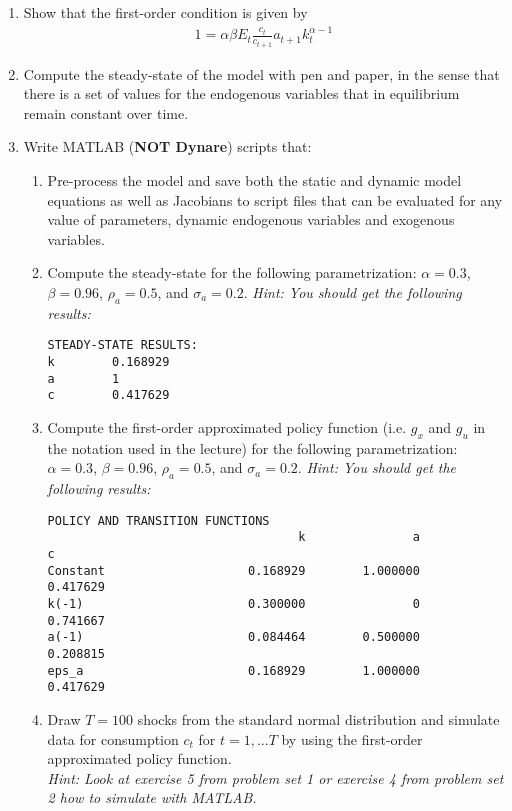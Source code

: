 \documentclass{article}
\begin{document}
\begin{enumerate}
	\item Show that the first-order condition is given by
	\begin{align}
	1 = \alpha \beta E_t \frac{c_{t}}{c_{t+1}} a_{t+1} k_{t}^{\alpha-1} \label{eq:BrockMirmanEuler}
	\end{align}
	\item Compute the steady-state of the model with pen and paper, in the sense that there is a set of values for the endogenous variables that in equilibrium remain constant over time.
    \item Write MATLAB (\textbf{NOT Dynare}) scripts that:
    \begin{enumerate}
        \item Pre-process the model and save both the static and dynamic model equations as well as Jacobians to script files that can be evaluated for any value of parameters, dynamic endogenous variables and exogenous variables.
        \item Compute the steady-state for the following parametrization: $\alpha=0.3$, $\beta=0.96$, $\rho_a=0.5$, and $\sigma_a=0.2$.
\emph{Hint: You should get the following results:}
\begin{verbatim}
STEADY-STATE RESULTS:
k 		 0.168929
a 		 1
c 		 0.417629
\end{verbatim}
        \item Compute the first-order approximated policy function (i.e. $g_x$ and $g_u$ in the notation used in the lecture) for the following parametrization: $\alpha=0.3$, $\beta=0.96$, $\rho_a=0.5$, and $\sigma_a=0.2$.
\emph{Hint: You should get the following results:}
\begin{verbatim}
POLICY AND TRANSITION FUNCTIONS
                                   k               a               c
Constant                    0.168929        1.000000        0.417629
k(-1)                       0.300000               0        0.741667
a(-1)                       0.084464        0.500000        0.208815
eps_a                       0.168929        1.000000        0.417629
\end{verbatim}
        \item Draw $T=100$ shocks from the standard normal distribution and simulate data for consumption $c_t$ for $t=1,...T$
        by using the first-order approximated policy function.
        \\\emph{Hint: Look at exercise 5 from problem set 1 or exercise 4 from problem set 2 how to simulate with MATLAB.}

\end{enumerate}
\end{enumerate}
\end{document}
